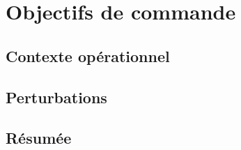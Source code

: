\chapter{Objectifs de commande}
\minitoc
\label{chap:objectif}

\section{Contexte opérationnel}


\section{Perturbations}

\section{Résumée}
